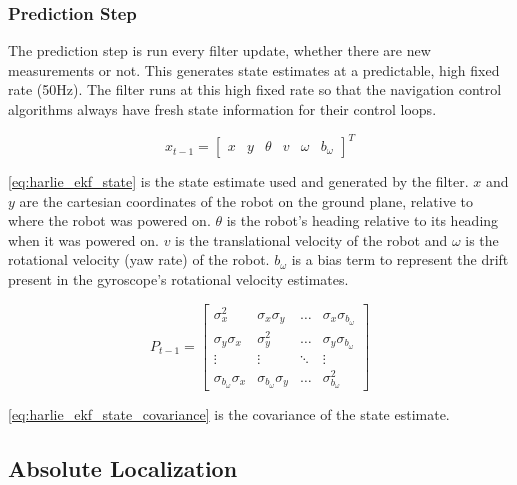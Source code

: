 \subsubsection{Prediction Step}\label{subsubsec:harlie_ekf_prediction}

The prediction step is run every filter update, whether there are new measurements or not. This generates state estimates at a predictable, high fixed rate (50Hz). The filter runs at this high fixed rate so that the navigation control algorithms always have fresh state information for their control loops.

\begin{equation}
	x_{t-1} = 
	\begin{bmatrix}
		x &
		y &
		\theta &
		v &
		\omega &
		b_{\omega}
	\end{bmatrix}^T
	\label{eq:harlie_ekf_state}
\end{equation}

\eqref{eq:harlie_ekf_state} is the state estimate used and generated by the filter. $x$ and $y$ are the cartesian coordinates of the robot on the ground plane, relative to where the robot was powered on. $\theta$ is the robot's heading relative to its heading when it was powered on. $v$ is the translational velocity of the robot and $\omega$ is the rotational velocity (yaw rate) of the robot. $b_{\omega}$ is a bias term to represent the drift present in the gyroscope's rotational velocity estimates.

\begin{equation}
	P_{t-1} =
	\begin{bmatrix}
		\sigma_x^2 & \sigma_x\sigma_y & \ldots & \sigma_x\sigma_{b_{\omega}} \\
		\sigma_y\sigma_x & \sigma_y^2 & \ldots & \sigma_y\sigma_{b_{\omega}} \\
		\vdots & \vdots & \ddots & \vdots \\
		\sigma_{b_{\omega}}\sigma_x & \sigma_{b_{\omega}}\sigma_y & 
			\ldots & \sigma_{b_{\omega}}^2
	\end{bmatrix}
	\label{eq:harlie_ekf_state_covariance}
\end{equation}

\eqref{eq:harlie_ekf_state_covariance} is the covariance of the state estimate. 

\subsection{Absolute Localization}\label{subsec:absolute_localization}

\begin{comment}
This section details the PSO used on HARLIE and has data and figures and shit for how accurate it is

Outline:
	Why do we need localization? Why do we need PRECISE localization?

	Parts
		Relative Localization
			EKF on HARLIE
		Absolute Localization
			AMCL algorithm
			Needs tuned to prevent pops
	Results

\end{comment}

